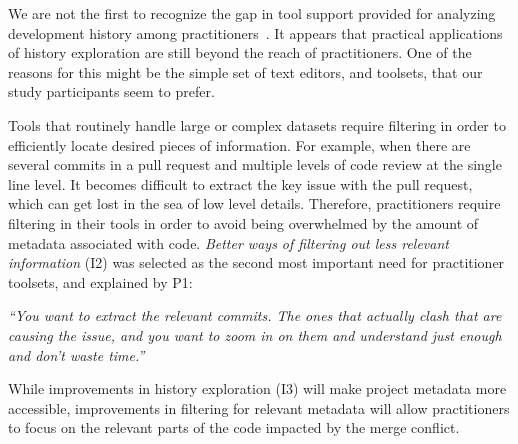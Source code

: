 We are not the first to recognize the gap in tool support provided for analyzing development history among practitioners~\cite{sun2015informationhistory, guo2016cold-start, yan2014miningcontracts}. 
It appears that practical applications of history exploration are still beyond the reach of practitioners. 
One of the reasons for this might be the simple set of text editors, and toolsets, that our study participants seem to prefer.

Tools that routinely handle large or complex datasets require filtering in order to efficiently locate desired pieces of information.
For example, when there are several commits in a pull request and multiple levels of code review at the single line level.
It becomes difficult to extract the key issue with the pull request, which can get lost in the sea of low level details.
Therefore, practitioners require filtering in their tools in order to avoid being overwhelmed by the amount of metadata associated with code.
\textit{Better ways of filtering out less relevant information} (I2) was selected as the second most important need for practitioner toolsets, and explained by P1:
\begin{displayquote}
\textit{``You want to extract the relevant commits. The ones that actually clash that are causing the issue, and you want to zoom in on them and understand just enough and don't waste time.''}
\end{displayquote}

While improvements in history exploration (I3) will make project metadata more accessible, improvements in filtering for relevant metadata will allow practitioners to focus on the relevant parts of the code impacted by the merge conflict.

